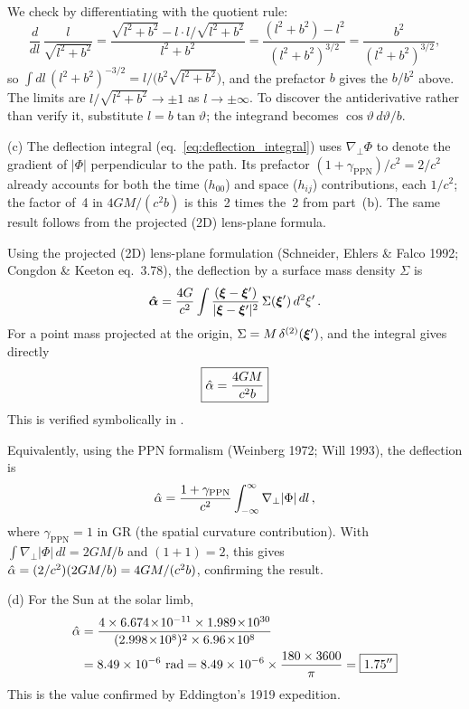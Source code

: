 \begin{derivation}
We check by differentiating with the quotient rule:
\[
\frac{d}{dl}\,\frac{l}{\sqrt{l^2 + b^2}}
= \frac{\sqrt{l^2 + b^2} - l\cdot l/\sqrt{l^2 + b^2}}{l^2 + b^2}
= \frac{(l^2 + b^2) - l^2}{(l^2 + b^2)^{3/2}}
= \frac{b^2}{(l^2 + b^2)^{3/2}} ,
\]
so $\int dl\,(l^2 + b^2)^{-3/2} = l/\bigl(b^2\sqrt{l^2 + b^2}\bigr)$, and the
prefactor $b$ gives the $b/b^2$ above.  The limits are
$l/\sqrt{l^2 + b^2} \to \pm1$ as $l \to \pm\infty$.  To discover the
antiderivative rather than verify it, substitute $l = b\tan\vartheta$;
the integrand becomes $\cos\vartheta\,d\vartheta/b$.
\end{derivation}


(c) The deflection integral
(eq.~\eqref{eq:deflection_integral}) uses $\nabla_\perp \Phi$ to denote
the gradient of $|\Phi|$ perpendicular to the path.  Its prefactor
$(1 + \gamma_{\mathrm{PPN}})/c^2 = 2/c^2$ already accounts for both the
time ($h_{00}$) and space ($h_{ij}$) contributions, each $1/c^2$; the
factor of~4 in $4GM/(c^2 b)$ is this~2 times the~2 from part~(b).  The
same result follows from the projected (2D) lens-plane formula.

Using the projected (2D) lens-plane formulation
(Schneider, Ehlers \& Falco 1992; Congdon \& Keeton eq.~3.78), the
deflection by a surface mass density $\Sigma$ is
\[
    \boldsymbol{\hat{\alpha}} = \frac{4G}{c^2}
    \int \frac{(\boldsymbol{\xi} - \boldsymbol{\xi}')}{|\boldsymbol{\xi} - \boldsymbol{\xi}'|^2}\,
    \Sigma(\boldsymbol{\xi}')\, d^2\xi' \,.
\]
For a point mass projected at the origin,
$\Sigma = M\,\delta^{(2)}(\boldsymbol{\xi}')$, and the integral gives directly
\[
    \boxed{\hat{\alpha} = \frac{4GM}{c^2 b}}
\]
This is verified symbolically in
.

Equivalently, using the PPN formalism (Weinberg 1972; Will 1993),
the deflection is
\[
    \hat{\alpha} = \frac{1 + \gamma_{\mathrm{PPN}}}{c^2}
    \int_{-\infty}^{\infty} \nabla_\perp |\Phi|\, dl \,,
\]
where $\gamma_{\mathrm{PPN}} = 1$ in GR (the spatial curvature
contribution).  With $\int \nabla_\perp |\Phi|\, dl = 2GM/b$ and
$(1 + 1) = 2$, this gives $\hat{\alpha} = (2/c^2)(2GM/b) = 4GM/(c^2 b)$,
confirming the result.

(d) For the Sun at the solar limb,
\begin{align*}
    \alphahat &= \frac{4 \times 6.674\!\times\!10^{-11} \times
    1.989\!\times\!10^{30}}{(2.998\!\times\!10^{8})^2 \times
    6.96\!\times\!10^{8}} \\
    &= 8.49 \times 10^{-6}~\text{rad}
    = 8.49 \times 10^{-6} \times \frac{180 \times 3600}{\pi}
    = \boxed{1.75''}
\end{align*}
This is the value confirmed by Eddington's 1919 expedition.

